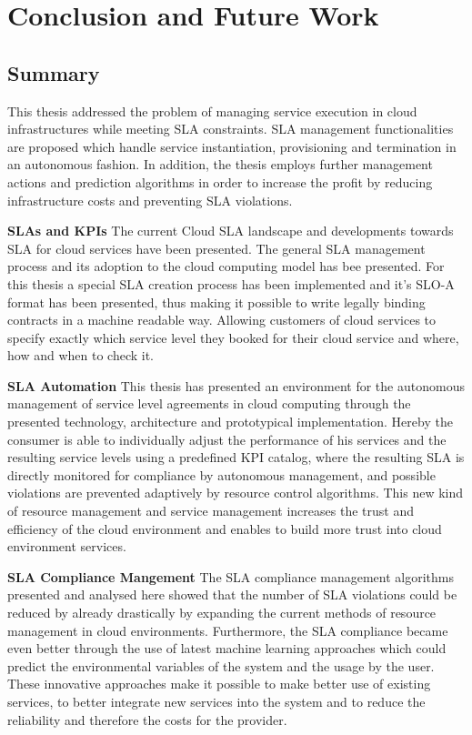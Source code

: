 
\chapter{Conclusion and Future Work} %

\label{Conclusion} %


\section{Summary}
This thesis addressed the problem of managing service execution in cloud infrastructures while meeting SLA constraints. SLA management functionalities are proposed which handle service instantiation, provisioning and termination in an autonomous fashion. In addition, the thesis employs further management actions and prediction algorithms in order to increase the profit by reducing infrastructure costs and preventing SLA violations.

\textbf{SLAs and KPIs} The current Cloud SLA landscape and developments towards SLA for cloud services have been presented. The general SLA management process and its adoption to the cloud computing model has bee presented. For this thesis a special SLA creation process has been implemented and it's SLO-A format has been presented, thus making it possible to write legally binding contracts in a machine readable way. Allowing customers of cloud services to specify exactly which service level they booked for their cloud service and where, how and when to check it.

\textbf{SLA Automation} This thesis has presented an environment for the autonomous management of service level agreements in cloud computing through the presented technology, architecture and prototypical implementation. Hereby the consumer is able to individually adjust the performance of his services and the resulting service levels using a predefined KPI catalog, where the resulting SLA is directly monitored for compliance by autonomous management, and possible violations are prevented adaptively by resource control algorithms. This new kind of resource management and service management increases the trust and efficiency of the cloud environment and enables to build more trust into cloud environment services.

\textbf{SLA Compliance Mangement} The SLA compliance management algorithms presented and analysed here showed that the number of SLA violations could be reduced by already drastically by expanding the current methods of resource management in cloud environments. Furthermore, the SLA compliance became even better through the use of latest machine learning approaches which could predict the environmental variables of the system and the usage by the user. These innovative approaches make it possible to make better use of existing services, to better integrate new services into the system and to reduce the reliability and therefore the costs for the provider.

